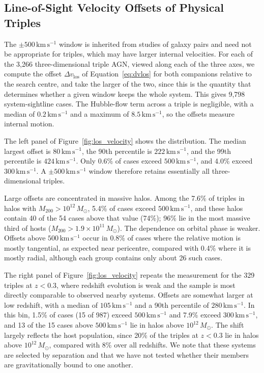 \documentclass[twocolumn, 10pt]{article}
\begin{document}
\subsection{Line-of-Sight Velocity Offsets of Physical Triples}
\label{subsec:los_velocity}

The $\pm 500\,\mathrm{km\,s^{-1}}$ window is inherited from studies of galaxy pairs \citep{Patton2000} and need not be appropriate for triples, which may have larger internal velocities. For each of the 3,266 three-dimensional triple AGN, viewed along each of the three axes, we compute the offset $\Delta v_\mathrm{los}$ of Equation~\ref{eq:dvlos} for both companions relative to the search centre, and take the larger of the two, since this is the quantity that determines whether a given window keeps the whole system. This gives 9,798 system-sightline cases. The Hubble-flow term across a triple is negligible, with a median of $0.2\,\mathrm{km\,s^{-1}}$ and a maximum of $8.5\,\mathrm{km\,s^{-1}}$, so the offsets measure internal motion.

The left panel of Figure~\ref{fig:los_velocity} shows the distribution. The median largest offset is $80\,\mathrm{km\,s^{-1}}$, the 90th percentile is $222\,\mathrm{km\,s^{-1}}$, and the 99th percentile is $424\,\mathrm{km\,s^{-1}}$. Only 0.6\% of cases exceed $500\,\mathrm{km\,s^{-1}}$, and 4.0\% exceed $300\,\mathrm{km\,s^{-1}}$. A $\pm 500\,\mathrm{km\,s^{-1}}$ window therefore retains essentially all three-dimensional triples.

Large offsets are concentrated in massive halos. Among the 7.6\% of triples in halos with $M_{200} > 10^{12}\,M_\odot$, 5.4\% of cases exceed $500\,\mathrm{km\,s^{-1}}$, and these halos contain 40 of the 54 cases above that value (74\%); 96\% lie in the most massive third of hosts ($M_{200} > 1.9 \times 10^{11}\,M_\odot$). The dependence on orbital phase is weaker. Offsets above $500\,\mathrm{km\,s^{-1}}$ occur in 0.8\% of cases where the relative motion is mostly tangential, as expected near pericentre, compared with 0.4\% where it is mostly radial, although each group contains only about 26 such cases.

The right panel of Figure~\ref{fig:los_velocity} repeats the measurement for the 329 triples at $z < 0.3$, where redshift evolution is weak and the sample is most directly comparable to observed nearby systems. Offsets are somewhat larger at low redshift, with a median of $105\,\mathrm{km\,s^{-1}}$ and a 90th percentile of $280\,\mathrm{km\,s^{-1}}$. In this bin, 1.5\% of cases (15 of 987) exceed $500\,\mathrm{km\,s^{-1}}$ and 7.9\% exceed $300\,\mathrm{km\,s^{-1}}$, and 13 of the 15 cases above $500\,\mathrm{km\,s^{-1}}$ lie in halos above $10^{12}\,M_\odot$. The shift largely reflects the host population, since 20\% of the triples at $z < 0.3$ lie in halos above $10^{12}\,M_\odot$, compared with 8\% over all redshifts. We note that these systems are selected by separation and that we have not tested whether their members are gravitationally bound to one another.
\end{document}
